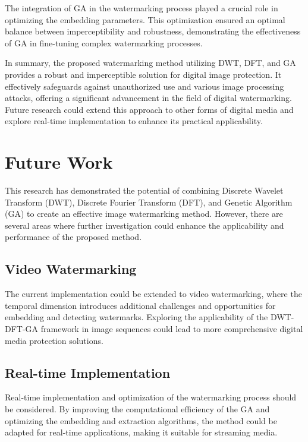 The integration of GA in the watermarking process played a crucial role in optimizing the embedding parameters. This optimization ensured an optimal balance between imperceptibility and robustness, demonstrating the effectiveness of GA in fine-tuning complex watermarking processes.

In summary, the proposed watermarking method utilizing DWT, DFT, and GA provides a robust and imperceptible solution for digital image protection. It effectively safeguards against unauthorized use and various image processing attacks, offering a significant advancement in the field of digital watermarking. Future research could extend this approach to other forms of digital media and explore real-time implementation to enhance its practical applicability.

\section{Future Work}

This research has demonstrated the potential of combining Discrete Wavelet Transform (DWT), Discrete Fourier Transform (DFT), and Genetic Algorithm (GA) to create an effective image watermarking method. However, there are several areas where further investigation could enhance the applicability and performance of the proposed method.

\subsection{Video Watermarking}

The current implementation could be extended to video watermarking, where the temporal dimension introduces additional challenges and opportunities for embedding and detecting watermarks. Exploring the applicability of the DWT-DFT-GA framework in image sequences could lead to more comprehensive digital media protection solutions.

\subsection{Real-time Implementation}

Real-time implementation and optimization of the watermarking process should be considered. By improving the computational efficiency of the GA and optimizing the embedding and extraction algorithms, the method could be adapted for real-time applications, making it suitable for streaming media.

